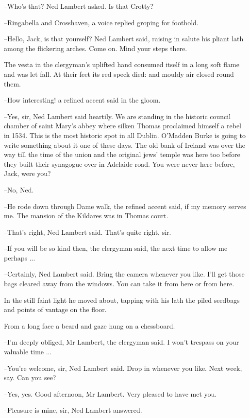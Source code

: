 --Who's that? Ned Lambert asked. Is that Crotty?

--Ringabella and Crosshaven, a voice replied groping for foothold.

--Hello, Jack, is that yourself? Ned Lambert said, raising in salute his
pliant lath among the flickering arches. Come on. Mind your steps there.

The vesta in the clergyman's uplifted hand consumed itself in a long soft
flame and was let fall. At their feet its red speck died: and mouldy air
closed round them.

--How interesting! a refined accent said in the gloom.

--Yes, sir, Ned Lambert said heartily. We are standing in the historic
council chamber of saint Mary's abbey where silken Thomas proclaimed
himself a rebel in 1534. This is the most historic spot in all Dublin.
O'Madden Burke is going to write something about it one of these days. The
old bank of Ireland was over the way till the time of the union and the
original jews' temple was here too before they built their synagogue over
in Adelaide road. You were never here before, Jack, were you?

--No, Ned.

--He rode down through Dame walk, the refined accent said, if my
memory serves me. The mansion of the Kildares was in Thomas court.

--That's right, Ned Lambert said. That's quite right, sir.

--If you will be so kind then, the clergyman said, the next time to allow
me perhaps ...

--Certainly, Ned Lambert said. Bring the camera whenever you like. I'll
get those bags cleared away from the windows. You can take it from here or
from here.

In the still faint light he moved about, tapping with his lath the piled
seedbags and points of vantage on the floor.

From a long face a beard and gaze hung on a chessboard.

--I'm deeply obliged, Mr Lambert, the clergyman said. I won't trespass on
your valuable time ...

--You're welcome, sir, Ned Lambert said. Drop in whenever you like. Next
week, say. Can you see?

--Yes, yes. Good afternoon, Mr Lambert. Very pleased to have met you.

--Pleasure is mine, sir, Ned Lambert answered.

